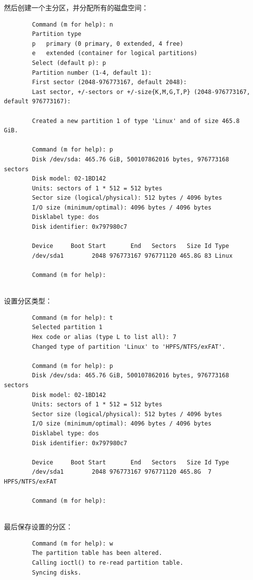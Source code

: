 \documentclass[UTF8]{article}
\begin{document}
	然后创建一个主分区，并分配所有的磁盘空间：
	
	\begin{lstlisting}
		Command (m for help): n
		Partition type
		p   primary (0 primary, 0 extended, 4 free)
		e   extended (container for logical partitions)
		Select (default p): p
		Partition number (1-4, default 1):
		First sector (2048-976773167, default 2048):
		Last sector, +/-sectors or +/-size{K,M,G,T,P} (2048-976773167, default 976773167):
		
		Created a new partition 1 of type 'Linux' and of size 465.8 GiB.
		
		Command (m for help): p
		Disk /dev/sda: 465.76 GiB, 500107862016 bytes, 976773168 sectors
		Disk model: 02-1BD142
		Units: sectors of 1 * 512 = 512 bytes
		Sector size (logical/physical): 512 bytes / 4096 bytes
		I/O size (minimum/optimal): 4096 bytes / 4096 bytes
		Disklabel type: dos
		Disk identifier: 0x797980c7
		
		Device     Boot Start       End   Sectors   Size Id Type
		/dev/sda1        2048 976773167 976771120 465.8G 83 Linux
		
		Command (m for help):
		
	\end{lstlisting}
	
	设置分区类型：
	
	\begin{lstlisting}
		Command (m for help): t
		Selected partition 1
		Hex code or alias (type L to list all): 7
		Changed type of partition 'Linux' to 'HPFS/NTFS/exFAT'.
		
		Command (m for help): p
		Disk /dev/sda: 465.76 GiB, 500107862016 bytes, 976773168 sectors
		Disk model: 02-1BD142
		Units: sectors of 1 * 512 = 512 bytes
		Sector size (logical/physical): 512 bytes / 4096 bytes
		I/O size (minimum/optimal): 4096 bytes / 4096 bytes
		Disklabel type: dos
		Disk identifier: 0x797980c7
		
		Device     Boot Start       End   Sectors   Size Id Type
		/dev/sda1        2048 976773167 976771120 465.8G  7 HPFS/NTFS/exFAT
		
		Command (m for help):
		
	\end{lstlisting}
	
	最后保存设置的分区：
	
	\begin{lstlisting}
		Command (m for help): w
		The partition table has been altered.
		Calling ioctl() to re-read partition table.
		Syncing disks.
		
	\end{lstlisting}
	
\end{document}
